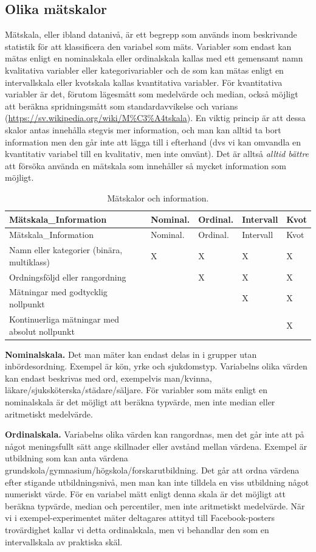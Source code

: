 \documentclass[
]{book}
\begin{document}
\hypertarget{sub07.3.1}{%
\subsection{Olika mätskalor}\label{sub07.3.1}}

Mätskala, eller ibland datanivå, är ett begrepp som används inom beskrivande statistik för att klassificera den variabel som mäts. Variabler som endast kan mätas enligt en nominalskala eller ordinalskala kallas med ett gemensamt namn kvalitativa variabler eller kategorivariabler och de som kan mätas enligt en intervallskala eller kvotskala kallas kvantitativa variabler. För kvantitativa variabler är det, förutom lägesmått som medelvärde och median, också möjligt att beräkna spridningsmått som standardavvikelse och varians (\url{https://sv.wikipedia.org/wiki/M\%C3\%A4tskala}). En viktig princip är att dessa skalor antas innehålla stegvis mer information, och man kan alltid ta bort information men den går inte att lägga till i efterhand (dvs vi kan omvandla en kvantitativ variabel till en kvalitativ, men inte omvänt). Det är alltså \emph{alltid bättre} att försöka använda en mätskala som innehåller så mycket information som möjligt.

\begin{longtable}[]{@{}lllll@{}}
\caption{\label{tab:tab-02-07-3-1-01}Mätskalor och information.}\tabularnewline
\toprule
Mätskala\_Information & Nominal. & Ordinal. & Intervall & Kvot\tabularnewline
\midrule
\endfirsthead
\toprule
Mätskala\_Information & Nominal. & Ordinal. & Intervall & Kvot\tabularnewline
\midrule
\endhead
Namn eller kategorier (binära, multiklass) & X & X & X & X\tabularnewline
Ordningsföljd eller rangordning & & X & X & X\tabularnewline
Mätningar med godtycklig nollpunkt & & & X & X\tabularnewline
Kontinuerliga mätningar med absolut nollpunkt & & & & X\tabularnewline
\bottomrule
\end{longtable}

\textbf{Nominalskala.} Det man mäter kan endast delas in i grupper utan inbördesordning. Exempel är kön, yrke och sjukdomstyp. Variabelns olika värden kan endast beskrivas med ord, exempelvis man/kvinna, läkare/sjuksköterska/städare/säljare. För variabler som mäts enligt en nominalskala är det möjligt att beräkna typvärde, men inte median eller aritmetiskt medelvärde.

\textbf{Ordinalskala.} Variabelns olika värden kan rangordnas, men det går inte att på något meningsfullt sätt ange skillnader eller avstånd mellan värdena. Exempel är utbildning som kan anta värdena grundskola/gymnasium/högskola/forskarutbildning. Det går att ordna värdena efter stigande utbildningsnivå, men man kan inte tilldela en viss utbildning något numeriskt värde. För en variabel mätt enligt denna skala är det möjligt att beräkna typvärde, median och percentiler, men inte aritmetiskt medelvärde. När vi i exempel-experimentet mäter deltagares attityd till Facebook-posters trovärdighet kallar vi detta ordinalskala, men vi behandlar den som en intervallskala av praktiska skäl.
\end{document}
